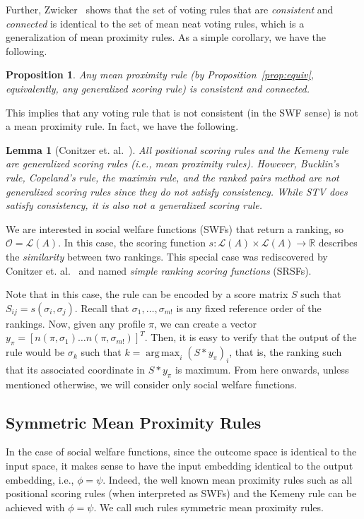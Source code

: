\documentclass[10pt,letterpaper]{article}
\newcommand{\calL}{{\mathcal{L}}}
\newcommand{\rank}{{\calL(A)}}
\newcommand{\calO}{{\mathcal{O}}}
\DeclareMathOperator*{\argmax}{arg\,max}
\newtheorem{lemma}{Lemma}
\newtheorem{proposition}{Proposition}
\begin{document}
Further, Zwicker~\cite{Zwicker08b} shows that the set of voting rules that are \emph{consistent} and \emph{connected} is identical to the set of mean neat voting rules, which is a generalization of mean proximity rules. As a simple corollary, we have the following.

\begin{proposition}
Any mean proximity rule (by Proposition~\ref{prop:equiv}, equivalently, any generalized scoring rule) is consistent and connected.
\end{proposition}

This implies that any voting rule that is not consistent (in the SWF sense) is not a mean proximity rule. In fact, we have the following.

\begin{lemma}[Conitzer et. al.~\cite{CRX09}]
All positional scoring rules and the Kemeny rule are generalized scoring rules (i.e., mean proximity rules). However, Bucklin's rule, Copeland's rule, the maximin rule, and the ranked pairs method are not generalized scoring rules since they do not satisfy consistency. While STV does satisfy consistency, it is also not a generalized scoring rule. 
\end{lemma}

We are interested in social welfare functions (SWFs) that return a ranking, so $\calO = \rank$. In this case, the scoring function $s : \rank \times \rank \rightarrow \mathbb{R}$ describes the \emph{similarity} between two rankings. This special case was rediscovered by Conitzer et. al.~\cite{CRX09} and named \emph{simple ranking scoring functions} (SRSFs). 

Note that in this case, the rule can be encoded by a score matrix $S$ such that $S_{ij} = s(\sigma_i,\sigma_j)$. Recall that $\sigma_1,\ldots,\sigma_{m!}$ is any fixed reference order of the rankings. Now, given any profile $\pi$, we can create a vector $y_{\pi} = [n(\pi,\sigma_1) \ldots n(\pi,\sigma_{m!})]^T$. Then, it is easy to verify that the output of the rule would be $\sigma_k$ such that $k = \argmax_i (S*y_{\pi})_i$, that is, the ranking such that its associated coordinate in $S*y_{\pi}$ is maximum. From here onwards, unless mentioned otherwise, we will consider only social welfare functions. 

\subsection{Symmetric Mean Proximity Rules}
In the case of social welfare functions, since the outcome space is identical to the input space, it makes sense to have the input embedding identical to the output embedding, i.e., $\phi = \psi$. Indeed, the well known mean proximity rules such as all positional scoring rules (when interpreted as SWFs) and the Kemeny rule can be achieved with $\phi = \psi$. We call such rules symmetric mean proximity rules.
\end{document}

